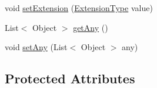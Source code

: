 \begin{DoxyCompactItemize}
\item 
void \hyperlink{classcom_1_1telefonica_1_1schemas_1_1unica_1_1rest_1_1directory_1_1v1_1_1UserPersonalInfoType_ab20b7c232ab00cf0dc8bfa6f50ff865c}{setExtension} (\hyperlink{classcom_1_1telefonica_1_1schemas_1_1unica_1_1rest_1_1common_1_1v1_1_1ExtensionType}{ExtensionType} value)
\item 
List$<$ Object $>$ \hyperlink{classcom_1_1telefonica_1_1schemas_1_1unica_1_1rest_1_1directory_1_1v1_1_1UserPersonalInfoType_a1cacdb428d7466f99c5c12c31d1103bf}{getAny} ()
\item 
void \hyperlink{classcom_1_1telefonica_1_1schemas_1_1unica_1_1rest_1_1directory_1_1v1_1_1UserPersonalInfoType_ae98745e562e6da75f48686b16470916c}{setAny} (List$<$ Object $>$ any)
\end{DoxyCompactItemize}
\subsection*{Protected Attributes}
